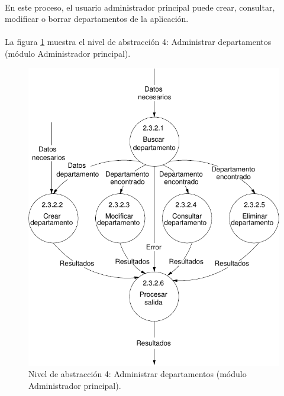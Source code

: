 \paragraph{}En este proceso, el usuario administrador principal puede crear,
consultar, modificar o borrar departamentos de la aplicación.

\paragraph{}La figura \ref{diagramaNivel4-AdministrarDepartamentos}
muestra el nivel de abstracción 4: Administrar departamentos (módulo
Administrador principal).

  \begin{figure}[!ht]
    \begin{center}
      \includegraphics[]{08.Analisis_Funcional/8.2.DFDs/Niveles/Nivel4/AdministradorPrincipal/AdministrarDepartamentos/Diagramas/nivel4-AdministrarDepartamentos.pdf}
      \caption{Nivel de abstracción 4: Administrar departamentos (módulo Administrador principal).}
      \label{diagramaNivel4-AdministrarDepartamentos}
    \end{center}
  \end{figure}
